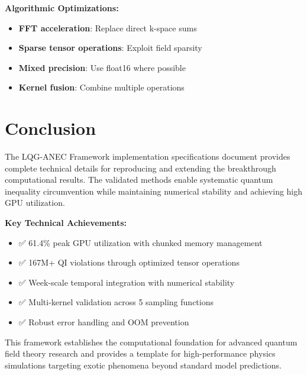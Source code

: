 \documentclass[11pt]{article}
\begin{document}
\textbf{Algorithmic Optimizations:}
\begin{itemize}
    \item \textbf{FFT acceleration}: Replace direct k-space sums
    \item \textbf{Sparse tensor operations}: Exploit field sparsity
    \item \textbf{Mixed precision}: Use float16 where possible
    \item \textbf{Kernel fusion}: Combine multiple operations
\end{itemize}

\section{Conclusion}

The LQG-ANEC Framework implementation specifications document provides complete technical details for reproducing and extending the breakthrough computational results. The validated methods enable systematic quantum inequality circumvention while maintaining numerical stability and achieving high GPU utilization.

\textbf{Key Technical Achievements:}
\begin{itemize}
    \item ✅ 61.4\% peak GPU utilization with chunked memory management
    \item ✅ 167M+ QI violations through optimized tensor operations
    \item ✅ Week-scale temporal integration with numerical stability
    \item ✅ Multi-kernel validation across 5 sampling functions
    \item ✅ Robust error handling and OOM prevention
\end{itemize}

This framework establishes the computational foundation for advanced quantum field theory research and provides a template for high-performance physics simulations targeting exotic phenomena beyond standard model predictions.
\end{document}
